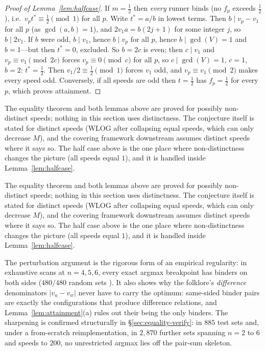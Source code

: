 \begin{proof}[Proof of Lemma~\ref{lem:halfcase}]
If $m=\tfrac12$ then \emph{every} runner binds (no $f_p$ exceeds
$\tfrac12$), i.e.\ $v_p t^\ast\equiv \tfrac12 \pmod 1$ for all $p$. Write
$t^\ast=a/b$ in lowest terms. Then $b\mid v_p-v_1$ for all $p$ (as
$\gcd(a,b)=1$), and $2v_1 a=b(2j+1)$ for some integer $j$, so $b\mid
2v_1$. If $b$ were odd, $b\mid v_1$, hence $b\mid v_p$ for all $p$, hence
$b\mid\gcd(V)=1$ and $b=1$---but then $t^\ast=0$, excluded. So $b=2c$ is
even; then $c\mid v_1$ and $v_p\equiv v_1\pmod{2c}$ forces
$v_p\equiv 0\pmod c$ for all $p$, so $c\mid\gcd(V)=1$, $c=1$, $b=2$:
$t^\ast=\tfrac12$. Then $v_1/2\equiv\tfrac12\pmod 1$ forces $v_1$ odd,
and $v_p\equiv v_1\pmod 2$ makes every speed odd. Conversely, if all
speeds are odd then $t=\tfrac12$ has $f_p=\tfrac12$ for every $p$,
which proves attainment.
\end{proof}

\begin{remark}
The equality theorem and both lemmas above are proved for possibly
non-distinct speeds; nothing in this section uses distinctness. The
conjecture itself is stated for distinct speeds (WLOG after collapsing
equal speeds, which can only decrease $M$), and the covering framework
downstream assumes distinct speeds where it says so. The half case
above is the one place where non-distinctness changes the picture
(all speeds equal $1$), and it is handled inside
Lemma~\ref{lem:halfcase}.
\end{remark}

\begin{remark}
The equality theorem and both lemmas above are proved for possibly
non-distinct speeds; nothing in this section uses distinctness. The
conjecture itself is stated for distinct speeds (WLOG after collapsing
equal speeds, which can only decrease $M$), and the covering framework
downstream assumes distinct speeds where it says so. The half case
above is the one place where non-distinctness changes the picture
(all speeds equal $1$), and it is handled inside
Lemma~\ref{lem:halfcase}.
\end{remark}

\begin{remark}\label{rem:twosided}
The perturbation argument is the rigorous form of an empirical
regularity: in exhaustive scans at $n=4,5,6$, every exact argmax
breakpoint has binders on both sides ($480/480$ random sets
\cite{prog-artifacts}). It also shows why the folklore's
\emph{difference} denominators $|v_u-v_w|$ never have to carry the
optimum: same-sided binder pairs are exactly the configurations that
produce difference relations, and Lemma~\ref{lem:attainment}(a) rules out
their being the only binders. The sharpening is confirmed structurally in
\S\ref{sec:equality-verify}: in $885$ test sets and, under a from-scratch
reimplementation, in $2{,}870$ further sets spanning $n=2$ to $6$ and
speeds to $200$, no unrestricted argmax lies off the pair-sum skeleton.
\end{remark}

